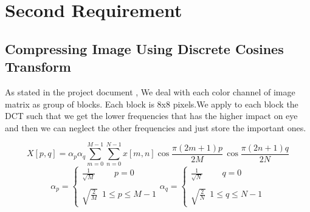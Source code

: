 \chapter{Second Requirement}
\section{Compressing Image Using Discrete Cosines Transform}
As stated in the project document , We deal with each color channel of image matrix as group of blocks. Each block is $8$x$8$ pixels.We apply to each block the DCT such that we get the lower frequencies that has the higher impact on eye and then we can neglect the other frequencies and just store the important ones.
\vspace{5pt}
\begin{tcolorbox}[colback=red!8!white,colframe=red!40!black,title=Discrete Cosines Transform Equation]
    $$X\left[p,q\right] = \alpha_p \alpha_q \sum_{m=0}^{M-1}\sum_{n=0}^{N-1}x[m,n] \cos{\frac{\pi \left(2m+1\right)p}{2M}} \, \cos{\frac{\pi \left(2n+1\right)q}{2N}}$$
    $$\alpha_p = \begin{cases}
        \frac{1}{\sqrt{M}}\hspace{27pt} p=0 \\\\
        \sqrt{\frac{2}{M}}\,\,\, 1 \leq p \leq M - 1
    \end{cases}
    \alpha_q = \begin{cases}
        \frac{1}{\sqrt{N}}\hspace{27pt} q=0 \\\\
        \sqrt{\frac{2}{N}}\,\,\, 1 \leq q \leq N - 1
    \end{cases}
    $$
\end{tcolorbox}
\vspace{5pt}

\vspace{5pt}